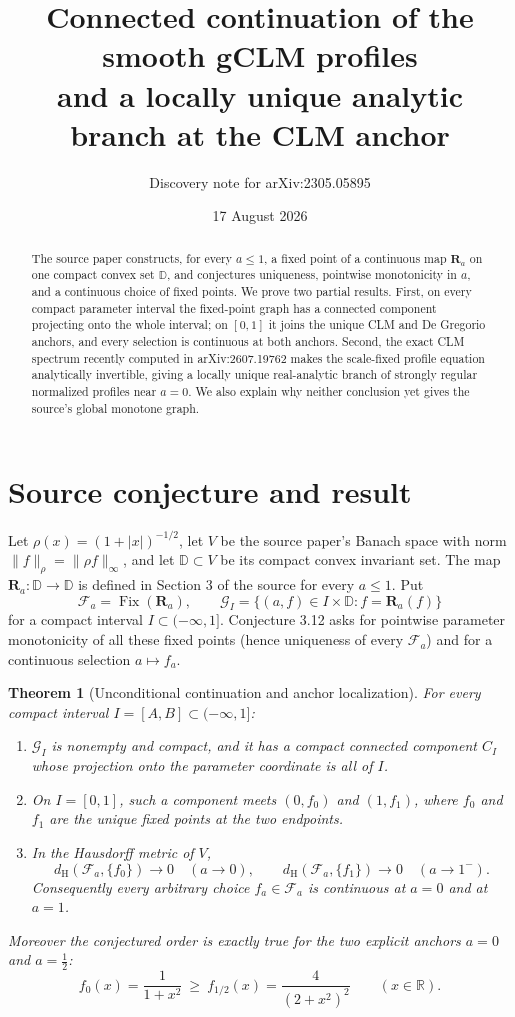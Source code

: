 \documentclass[11pt]{article}
\title{Connected continuation of the smooth gCLM profiles\\
and a locally unique analytic branch at the CLM anchor}
\author{Discovery note for arXiv:2305.05895}
\date{17 August 2026}
\newtheorem{theorem}{Theorem}
\newcommand{\R}{\mathbb R}
\newcommand{\D}{\mathbb D}
\newcommand{\Fix}{\operatorname{Fix}}
\newcommand{\distH}{d_{\mathrm H}}
\newcommand{\cR}{\mathbf R}
\begin{document}
\maketitle

\begin{abstract}
The source paper constructs, for every $a\leq1$, a fixed point of a
continuous map $\cR_a$ on one compact convex set $\D$, and conjectures
uniqueness, pointwise monotonicity in $a$, and a continuous choice of fixed
points.  We prove two partial results.  First, on every compact parameter
interval the fixed-point graph has a connected component projecting onto the
whole interval; on $[0,1]$ it joins the unique CLM and De Gregorio anchors,
and every selection is continuous at both anchors.  Second, the exact CLM
spectrum recently computed in arXiv:2607.19762 makes the scale-fixed profile
equation analytically invertible, giving a locally unique real-analytic
branch of strongly regular normalized profiles near $a=0$.  We also explain
why neither conclusion yet gives the source's global monotone graph.
\end{abstract}

\section{Source conjecture and result}

Let $\rho(x)=(1+|x|)^{-1/2}$, let $V$ be the source paper's Banach space with
norm $\|f\|_\rho=\|\rho f\|_\infty$, and let $\D\subset V$ be its compact
convex invariant set.  The map $\cR_a:\D\to\D$ is defined in Section 3 of
the source for every $a\leq1$.  Put
\[
 \mathcal F_a=\Fix(\cR_a),\qquad
 \mathcal G_I=\{(a,f)\in I\times\D:f=\cR_a(f)\}
\]
for a compact interval $I\subset(-\infty,1]$.
Conjecture 3.12 asks for pointwise parameter monotonicity of all these fixed
points (hence uniqueness of every $\mathcal F_a$) and for a continuous
selection $a\mapsto f_a$.

\begin{theorem}[Unconditional continuation and anchor localization]
\label{thm:continuation}
For every compact interval $I=[A,B]\subset(-\infty,1]$:
\begin{enumerate}
\item $\mathcal G_I$ is nonempty and compact, and it has a compact connected
component $C_I$ whose projection onto the parameter coordinate is all of
$I$.
\item On $I=[0,1]$, such a component meets $(0,f_0)$ and $(1,f_1)$, where
$f_0$ and $f_1$ are the unique fixed points at the two endpoints.
\item In the Hausdorff metric of $V$,
\[
 \distH(\mathcal F_a,\{f_0\})\longrightarrow0\quad(a\to0),
 \qquad
 \distH(\mathcal F_a,\{f_1\})\longrightarrow0\quad(a\to1^-).
\]
Consequently every arbitrary choice $f_a\in\mathcal F_a$ is continuous at
$a=0$ and at $a=1$.
\end{enumerate}
Moreover the conjectured order is exactly true for the two explicit anchors
$a=0$ and $a=\tfrac12$:
\[
 f_0(x)=\frac1{1+x^2}\ \geq\
 f_{1/2}(x)=\frac4{(2+x^2)^2}\qquad(x\in\R).
\]
\end{theorem}
\end{document}
